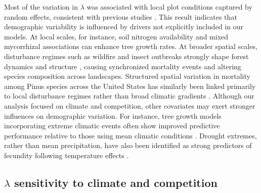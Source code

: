 Most of the variation in \(\lambda\) was associated with local plot
conditions captured by random effects, consistent with previous studies
\citep{Vanderwel2016a, LeSquin2021, itter2024making}. This result
indicates that demographic variability is influenced by drivers not
explicitly included in our models. At local scales, for instance, soil
nitrogen availability \citep{Ibanez2018} and mixed mycorrhizal
associations \citep{Luo2023} can enhance tree growth rates. At broader
spatial scales, disturbance regimes such as wildfire and insect
outbreaks strongly shape forest dynamics and structure
\citep{Franklin2002}, causing synchronized mortality events and altering
species composition across landscapes. Structured spatial variation in
mortality among Pinus species across the United States has similarly
been linked primarily to local disturbance regimes rather than broad
climatic gradients \citep{bauman2025mosaic}. Although our analysis
focused on climate and competition, other covariates may exert stronger
influences on demographic variation. For instance, tree growth models
incorporating extreme climatic events often show improved predictive
performance relative to those using mean climatic conditions
\citep{Sangines2017}. Drought extremes, rather than mean precipitation,
have also been identified as strong predictors of fecundity following
temperature effects \citep{Clark2011}.\\

\hypertarget{lambda-sensitivity-to-climate-and-competition-1}{%
\subsection{\texorpdfstring{\(\lambda\) sensitivity to climate and
competition}{\textbackslash lambda sensitivity to climate and competition}}\label{lambda-sensitivity-to-climate-and-competition-1}}

